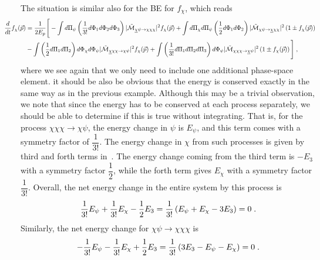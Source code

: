 \documentclass[11pt,a4paper]{article}
\begin{document}
The situation is similar  also for the BE for $f_\chi$, which reads
%
\begin{eqnarray}\hspace{-0.95cm}
\dfrac{d}{dt} f_{\chi }(\vec{p}) &= \dfrac{1}{2E_p} \lrBiggsb{
	-\dint d\Pi_{\psi} \lrb{\dfrac{1}{3!} d\Phi_{1} d\Phi_{2}d\Phi_{3}}   \tM{\underline{\chi} \psi}{\chi\chi \chi } f_{\chi }(\vec{p} )
	+ \dint d\Pi_{\chi} d\Pi_{\psi} \lrb{\dfrac{1}{2}d\Phi_{1}d\Phi_{2}}  \tM{\chi \psi }{\underline{\chi} \chi\chi} \lrb{1\pm f_{\chi }(\vec{p})} 
	\nonumber \\
	&- \dint \lrb{\dfrac{1}{2}d\Pi_{1}d\Pi_{2}}  d\Phi_{\chi} d\Phi_{\psi}   \tM{\underline{\chi} \chi\chi}{\chi \psi } f_{\chi }(\vec{p})
	+ \dint \lrb{\dfrac{1}{3!} d\Pi_{1} d\Pi_{2}d\Pi_{3}}  d\Phi_{\psi}  \tM{\chi\chi \chi }{\underline{\chi} \psi} \lrb{1\pm f_{\chi }(\vec{p})}
} \;,
%
\label{eq:BE_23-chi}
\end{eqnarray}  
%
where we see again that we only need to include one additional phase-space element. it should be also be obvious that the energy is conserved exactly in the same way as in the previous example. Although this may be a trivial observation, we note that since the energy has to be conserved at each process separately, we should be able to determine if this is true without integrating. 
%
That is, for the process $\chi \chi \chi \to \chi \psi$, the energy change in $\psi$ is $E_{\psi}$, and this term comes with a symmetry factor of $\dfrac{1}{3!}$. The energy change in $\chi$ from such processes is given by third and forth terms in~. The energy change coming from the third term is $-E_{3}$ with a symmetry factor $\dfrac{1}{2}$, while the forth term gives $E_{\chi}$ with a symmetry factor $\dfrac{1}{3!}$. Overall, the net energy change in the entire system by this process is 
$$
\dfrac{1}{3!} E_\psi + \dfrac{1}{3!} E_\chi - \dfrac{1}{2} E_3 =  \dfrac{1}{3!} \left( E_\psi+E_\chi  - 3 E_3  \right) = 0 \;.
$$      
%
Similarly, the net energy change for $\chi \psi \to \chi \chi \chi$  is 
$$
-\dfrac{1}{3!} E_\psi -\dfrac{1}{3!} E_\chi + \dfrac{1}{2} E_3 = \dfrac{1}{3!} \left( 3 E_3 - E_\psi - E_\chi   \right) = 0 \;.
$$
\end{document}
